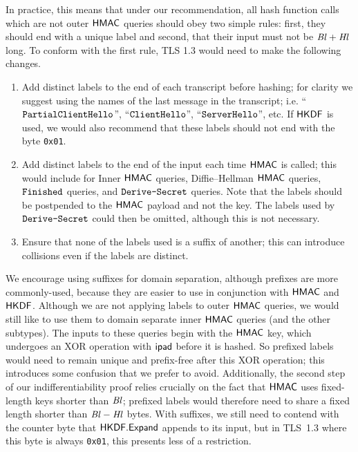 In practice, this means that under our recommendation, all hash function calls which are not outer $\mathsf{HMAC}$ queries should obey two simple rules: first, they should end with a unique label and second, that their input must not be $\mathit{Bl}+\mathit{Hl}$ long.
To conform with the first rule, TLS 1.3 would need to make the following changes.
\begin{enumerate}
	\item Add distinct labels to the end of each transcript before hashing; for clarity we suggest using the names of the last message in the transcript; i.e. ``$\mathtt{PartialClientHello}$'', ``$\mathtt{ClientHello}$'', ``$\mathtt{ServerHello}$'', etc. If $\mathsf{HKDF}$ is used, we would also recommend that these labels should not end with the byte \texttt{0x01}.
	\item Add distinct labels to the end of the input each time $\mathsf{HMAC}$ is called; this would include for Inner $\mathsf{HMAC}$ queries, Diffie--Hellman $\mathsf{HMAC}$ queries, $\mathtt{Finished}$ queries, and $\texttt{Derive-Secret}$ queries. Note that the labels should be postpended to the $\mathsf{HMAC}$ payload and not the key. The labels used by $\texttt{Derive-Secret}$ could then be omitted, although this is not necessary.
	\item Ensure that none of the labels used is a suffix of another; this can introduce collisions even if the labels are distinct.
\end{enumerate}
We encourage using suffixes for domain separation, although prefixes are more commonly-used, because they are easier to use in conjunction with $\mathsf{HMAC}$ and $\mathsf{HKDF}$.
Although we are not applying labels to outer $\mathsf{HMAC}$ queries, we would still like to use them to domain separate inner $\mathsf{HMAC}$ queries (and the other subtypes).
The inputs to these queries begin with the $\mathsf{HMAC}$ key, which undergoes an XOR operation with $\mathsf{ipad}$ before it is hashed.
So prefixed labels would need to remain unique and prefix-free after this XOR operation; this introduces some confusion that we prefer to avoid.
Additionally, the second step of our indifferentiability proof relies crucially on the fact that $\mathsf{HMAC}$ uses fixed-length keys shorter than $\mathit{Bl}$; prefixed labels would therefore need to share a fixed length shorter than $\mathit{Bl}-\mathit{Hl}$ bytes. 
With suffixes, we still need to contend with the counter byte that $\mathsf{HKDF.Expand}$ appends to its input, but in TLS~1.3 where this byte is always \texttt{0x01}, this presents less of a restriction.

